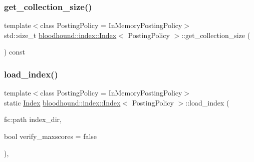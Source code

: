 \subsubsection{\texorpdfstring{get\+\_\+collection\+\_\+size()}{get\_collection\_size()}}
{\footnotesize\ttfamily template$<$class Posting\+Policy = In\+Memory\+Posting\+Policy$>$ \\
std\+::size\+\_\+t \hyperlink{classbloodhound_1_1index_1_1Index}{bloodhound\+::index\+::\+Index}$<$ Posting\+Policy $>$\+::get\+\_\+collection\+\_\+size (\begin{DoxyParamCaption}{ }\end{DoxyParamCaption}) const\hspace{0.3cm}{\ttfamily [inline]}}

\mbox{\label{classbloodhound_1_1index_1_1Index_ad4cd13bef623fc6b786f8003c8826b9c}} 
\subsubsection{\texorpdfstring{load\+\_\+index()}{load\_index()}}
{\footnotesize\ttfamily template$<$class Posting\+Policy = In\+Memory\+Posting\+Policy$>$ \\
static \hyperlink{classbloodhound_1_1index_1_1Index}{Index} \hyperlink{classbloodhound_1_1index_1_1Index}{bloodhound\+::index\+::\+Index}$<$ Posting\+Policy $>$\+::load\+\_\+index (\begin{DoxyParamCaption}\item[{fs\+::path}]{index\+\_\+dir,  }\item[{bool}]{verify\+\_\+maxscores = {\ttfamily false} }\end{DoxyParamCaption})\hspace{0.3cm}{\ttfamily [inline]}, {\ttfamily [static]}}

\mbox{\label{classbloodhound_1_1index_1_1Index_a80968041cad02a4006fd4b633c279030}} 
